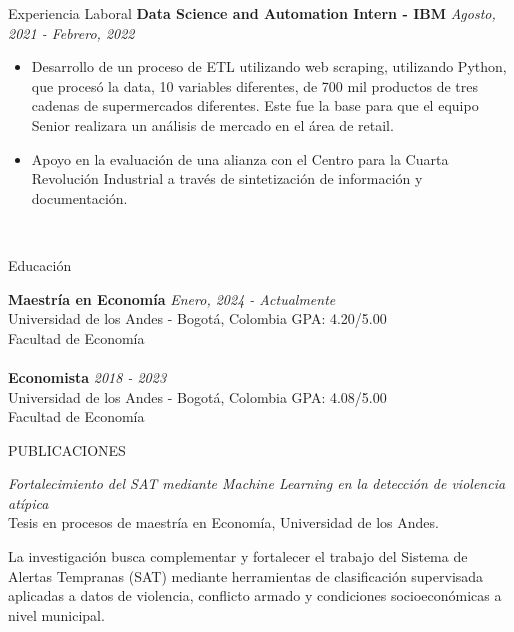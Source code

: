 \documentclass{resume}
\begin{document}
\begin{rSection}{Experiencia Laboral}
{\bf Data Science and Automation Intern - IBM} \hfill {\em Agosto, 2021 - Febrero, 2022} 
\begin{itemize}
    \item Desarrollo de un proceso de ETL utilizando web scraping, utilizando Python, que procesó la data, 10 variables diferentes, de 700 mil productos de tres cadenas de supermercados diferentes. Este fue la base para que el equipo Senior realizara un análisis de mercado en el área de retail.
    \item Apoyo en la evaluación de una alianza con el Centro para la Cuarta Revolución Industrial a través de sintetización de información y documentación. 
\end{itemize}\\ 


\end{rSection}

\begin{rSection}{Educación}

{\bf Maestría en Economía} \hfill {\em Enero, 2024 - Actualmente} 
\\ Universidad de los Andes - Bogotá, Colombia \hfill 
{ GPA: 4.20/5.00}
\\ Facultad de Economía
\\
\\{\bf Economista} \hfill {\em 2018 - 2023} 
\\ Universidad de los Andes - Bogotá, Colombia \hfill { GPA: 4.08/5.00}
\\ Facultad de Economía
\end{rSection}

\begin{rSection}{PUBLICACIONES}

\textit{Fortalecimiento del SAT mediante Machine Learning en la detección de violencia atípica}
\\ \small{Tesis en procesos de maestría en Economía, Universidad de los Andes.}  
\vspace{-2mm}
\begin{tcolorbox}[colback=gray!5, colframe=black!20, boxrule=0.4pt, arc=2pt]
La investigación busca complementar y fortalecer el trabajo del Sistema de Alertas Tempranas (SAT) mediante herramientas de clasificación supervisada aplicadas a datos de violencia, conflicto armado y condiciones socioeconómicas a nivel municipal.
\end{tcolorbox}
\end{rSection}
\end{document}
